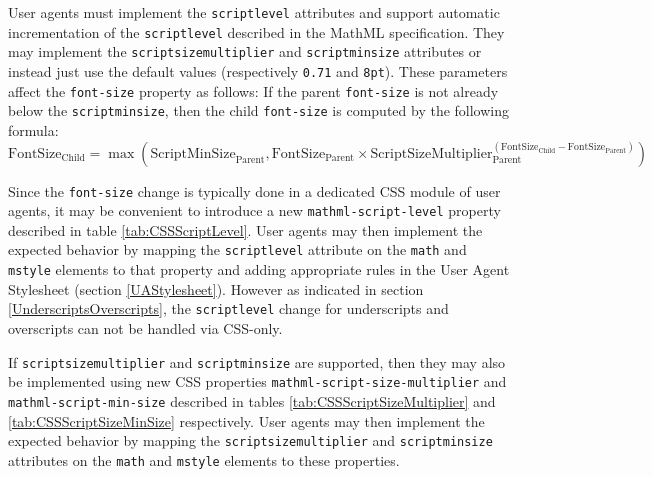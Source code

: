 User agents must implement the {\tt scriptlevel} attributes and support
automatic incrementation of the {\tt scriptlevel} described in the MathML
specification. They may implement the {\tt scriptsizemultiplier} and
{\tt scriptminsize} attributes or instead just use the default values
(respectively {\tt 0.71} and {\tt 8pt}). These parameters affect the
{\tt font-size} property as follows: If the parent
{\tt font-size} is not already below the {\tt scriptminsize}, then the
child {\tt font-size} is computed by the following formula:
%
\begin{equation}
\text{FontSize}_{\text{Child}} =
{\max \left(
  \text{ScriptMinSize}_{\text{Parent}},
  {\text{FontSize}_{\text{Parent}} \times
    {\text{ScriptSizeMultiplier}_{\text{Parent}}^
      {\left(\text{FontSize}_{\text{Child}} -
            \text{FontSize}_{\text{Parent}}\right)}
  }}
\right)}\label{eq:fontsize}
\end{equation}

Since the {\tt font-size} change is typically done in a dedicated CSS module of
user agents, it may be convenient to introduce a new
{\tt mathml-script-level} property described in table \ref{tab:CSSScriptLevel}.
User agents may then implement the expected behavior by mapping the
{\tt scriptlevel} attribute on the {\tt math} and {\tt mstyle} elements to that
property and adding appropriate rules in the User Agent Stylesheet
(section \ref{UAStylesheet}). However as indicated in section
\ref{UnderscriptsOverscripts}, the {\tt scriptlevel} change for underscripts
and overscripts can not be handled via CSS-only.

If {\tt scriptsizemultiplier} and {\tt scriptminsize}
are supported, then they may also be implemented using new CSS properties
{\tt mathml-script-size-multiplier} and {\tt mathml-script-min-size}
described in tables \ref{tab:CSSScriptSizeMultiplier} and
\ref{tab:CSSScriptSizeMinSize} respectively. User agents may then implement
the expected behavior by mapping the {\tt scriptsizemultiplier}
and {\tt scriptminsize} attributes on the {\tt math} and {\tt mstyle} elements
to these properties.


